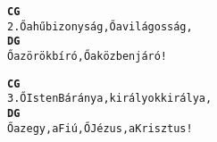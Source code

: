 \begin{minipage}{\textwidth}
\kottastart
{}
\kottaend
\begin{minipage}{\textwidth}
\begin{multicols}{2}
\begin{minipage}{\textwidth}
\begin{alltt}
\textbf{   C                 G}
2. Ő a hű bizonyság, Ő a világosság,
\textbf{   D               G}
   Ő az örök bíró, Ő a közbenjáró!
\end{alltt}
\vspace{0.0cm}
\versszakspacing
\end{minipage}
\begin{minipage}{\textwidth}
\begin{alltt}
\textbf{   C                 G}
3. Ő Isten Báránya, királyok királya,
\textbf{   D                G}
   Ő az egy, a Fiú, Ő Jézus, a Krisztus!
\end{alltt}
\vspace{0.0cm}
\versszakspacing
\end{minipage}
\vspace{0.2cm}
\end{multicols}
\end{minipage}

\end{minipage}
~\vspace{1.0cm}
\newline
